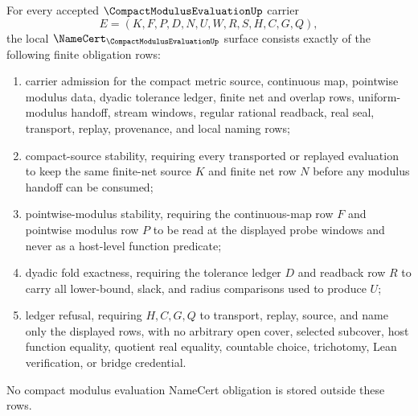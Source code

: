 \begin{theorem}
\label{thm:compact-modulus-evaluation-namecert-obligations}
For every accepted $\CompactModulusEvaluationUp$ carrier
$$
E=(K,F,P,D,N,U,W,R,S,H,C,G,Q),
$$
the local $\NameCert_{\CompactModulusEvaluationUp}$ surface consists exactly of the following finite obligation rows:
\begin{enumerate}
\item carrier admission for the compact metric source, continuous map, pointwise modulus data, dyadic tolerance ledger, finite net and overlap rows, uniform-modulus handoff, stream windows, regular rational readback, real seal, transport, replay, provenance, and local naming rows;
\item compact-source stability, requiring every transported or replayed evaluation to keep the same finite-net source $K$ and finite net row $N$ before any modulus handoff can be consumed;
\item pointwise-modulus stability, requiring the continuous-map row $F$ and pointwise modulus row $P$ to be read at the displayed probe windows and never as a host-level function predicate;
\item dyadic fold exactness, requiring the tolerance ledger $D$ and readback row $R$ to carry all lower-bound, slack, and radius comparisons used to produce $U$;
\item ledger refusal, requiring $H,C,G,Q$ to transport, replay, source, and name only the displayed rows, with no arbitrary open cover, selected subcover, host function equality, quotient real equality, countable choice, trichotomy, Lean verification, or bridge credential.
\end{enumerate}
No compact modulus evaluation NameCert obligation is stored outside these rows.
\end{theorem}
